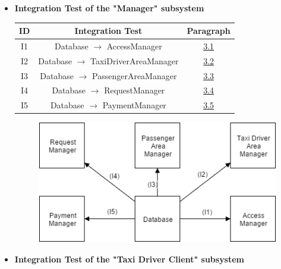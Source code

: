 \documentclass[18pt,oneside,a4paper, titlepage]{article}
\begin{document}
			\begin{itemize}
				
				
				\item \textbf{Integration Test of the "Manager" subsystem }
					\vspace{1cm}
					\begin{center}
						\centering
						\begin{tabular}{c c c}
							\hline \textbf{ID} & \textbf{Integration Test} & \textbf{Paragraph} \\
							\hline		I1 &  Database $\rightarrow$ AccessManager & \hyperlink{chapter 3.1}{3.1}\\
							\hline		I2 & Database $\rightarrow$ TaxiDriverAreaManager & \hyperlink{chapter 3.2}{3.2} \\
							\hline		I3 & Database $\rightarrow$ PassengerAreaManager & \hyperlink{chapter 3.3}{3.3}\\
							\hline		I4 & Database $\rightarrow$ RequestManager & \hyperlink{chapter 3.4}{3.4} \\
							\hline		I5 & Database $\rightarrow$ PaymentManager & \hyperlink{chapter 3.5}{3.5} \\
							\hline
						\end{tabular}
					\end{center}
					
					
					\begin{figure}[h]
						\centering
						\includegraphics[scale=0.5]{ManagerSubsystem.png}
					\end{figure}
					
					\vspace{1cm}
					
				\item \textbf{Integration Test of the "Taxi Driver Client" subsystem }
					

\end{itemize}
\end{document}
